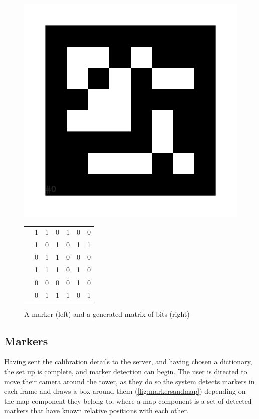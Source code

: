\begin{figure}[ht]
\centering
\begin{minipage}{.3\textwidth}
    \includegraphics[width=.8\textwidth]{images/implementation/aruco_mip_36h12_00000}
\end{minipage}
\hspace{2pt}
\begin{minipage}{.3\textwidth}
\begin{tabular}{lllllll}
& 1 & 1 & 0 & 1 & 0 & 0 \\
& 1 & 0 & 1 & 0 & 1 & 1 \\
& 0 & 1 & 1 & 0 & 0 & 0 \\
& 1 & 1 & 1 & 0 & 1 & 0 \\
& 0 & 0 & 0 & 0 & 1 & 0 \\
& 0 & 1 & 1 & 1 & 0 & 1
\end{tabular}
\end{minipage}
\caption{A marker (left) and a generated matrix of bits (right)}
\label{fig:markerconversion}
\end{figure}
    
\subsection{Markers}

Having sent the calibration details to the server, and having chosen a dictionary, the set up is complete, and marker detection can begin. The user is directed to move their camera around the tower, as they do so the system detects markers in each frame and draws a box around them (\cref{fig:markersandmap}) depending on the map component they belong to, where a map component is a set of detected markers that have known relative positions with each other.

